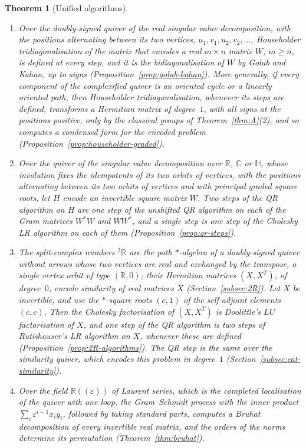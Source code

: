 \documentclass[12pt, a4paper]{report}
\theoremstyle{plain}
\theoremstyle{definition}
\theoremstyle{remark}
\theoremstyle{plain}
\newtheorem{mainthm}{Theorem}
\newcommand{\RR}{\mathbb{R}}
\newcommand{\CC}{\mathbb{C}}
\newcommand{\HH}{\mathbb{H}}
\newcommand{\twoR}{{}^{2}\mathbb{R}}
\begin{document}
\begin{mainthm}[Unified algorithms]\label{thm:B}
\leavevmode
\begin{enumerate}
  \item Over the doubly-signed quiver of the real singular value decomposition, with the positions alternating between its two vertices, $u_1,v_1,u_2,v_2,\dots$, Householder tridiagonalisation of the matrix that encodes a real $m\times n$ matrix $W$, $m\geq n$, is defined at every step, and it is the bidiagonalisation of $W$ by Golub and Kahan, up to signs (Proposition~\ref{prop:golub-kahan}). More generally, if every component of the complexified quiver is an oriented cycle or a linearly oriented path, then Householder tridiagonalisation, whenever its steps are defined, transforms a Hermitian matrix of degree~$1$, with all signs at the positions positive, only by the classical groups of Theorem~\ref{thm:A}(2), and so computes a condensed form for the encoded problem (Proposition~\ref{prop:householder-graded}).
  \item Over the quiver of the singular value decomposition over $\RR$, $\CC$ or $\HH$, whose involution fixes the idempotents of its two orbits of vertices, with the positions alternating between its two orbits of vertices and with principal graded square roots, let $H$ encode an invertible square matrix $W$. Two steps of the QR algorithm on $H$ are one step of the unshifted QR algorithm on each of the Gram matrices $W^*W$ and $WW^*$, and a single step is one step of the Cholesky LR algorithm on each of them (Proposition~\ref{prop:qr-steps}).
  \item The split-complex numbers $\twoR$ are the path $*$-algebra of a doubly-signed quiver without arrows whose two vertices are real and exchanged by the transpose, a single vertex orbit of type $(\RR,0)$; their Hermitian matrices $(X,X^T)$, of degree~$0$, encode similarity of real matrices $X$ (Section~\ref{subsec:2R}). Let $X$ be invertible, and use the $*$-square roots $(c,1)$ of the self-adjoint elements $(c,c)$. Then the Cholesky factorisation of $(X,X^T)$ is Doolittle's $LU$ factorisation of $X$, and one step of the QR algorithm is two steps of Rutishauser's LR algorithm on $X$, whenever these are defined (Proposition~\ref{prop:2R-algorithms}). The QR step is the same over the similarity quiver, which encodes this problem in degree~$1$ (Section~\ref{subsec:cat-similarity}).
  \item Over the field $\RR((\varepsilon))$ of Laurent series, which is the completed localisation of the quiver with one loop, the Gram--Schmidt process with the inner product $\sum_i\varepsilon^{i-1}x_iy_i$, followed by taking standard parts, computes a Bruhat decomposition of every invertible real matrix, and the orders of the norms determine its permutation (Theorem~\ref{thm:bruhat}).
\end{enumerate}
\end{mainthm}
\end{document}
